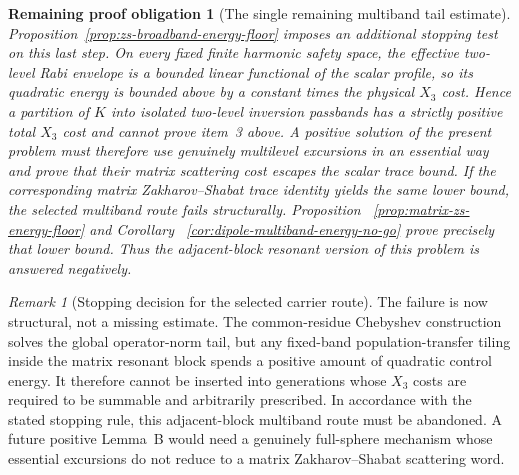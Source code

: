 \documentclass[11pt]{article}
\newtheorem{problem}[theorem]{Remaining proof obligation}
\theoremstyle{remark}
\newtheorem{remark}[theorem]{Remark}
\begin{document}
\begin{problem}[The single remaining multiband tail estimate]
Proposition~\ref{prop:zs-broadband-energy-floor} imposes an additional stopping
test on this last step.  On every fixed finite harmonic safety space, the
effective two-level Rabi envelope is a bounded linear functional of the scalar
profile, so its quadratic energy is bounded above by a constant times the
physical $X_3$ cost.  Hence a partition of $K$ into isolated two-level
inversion passbands has a strictly positive total $X_3$ cost and cannot prove
item~3 above.  A positive solution of the present problem must therefore use
genuinely multilevel excursions in an essential way and prove that their
matrix scattering cost escapes the scalar trace bound.  If the corresponding
matrix Zakharov--Shabat trace identity yields the same lower bound, the
selected multiband route fails structurally.  Proposition
~\ref{prop:matrix-zs-energy-floor} and Corollary
~\ref{cor:dipole-multiband-energy-no-go} prove precisely that lower bound.
Thus the adjacent-block resonant version of this problem is answered
negatively.
\end{problem}

\begin{remark}[Stopping decision for the selected carrier route]
\label{rem:dipole-carrier-route-stops}
The failure is now structural, not a missing estimate.  The common-residue
Chebyshev construction solves the global operator-norm tail, but any
fixed-band population-transfer tiling inside the matrix resonant block spends
a positive amount of quadratic control energy.  It therefore cannot be
inserted into generations whose $X_3$ costs are required to be summable and
arbitrarily prescribed.  In accordance with the stated stopping rule, this
adjacent-block multiband route must be abandoned.  A future positive Lemma~B
would need a genuinely full-sphere mechanism whose essential excursions do
not reduce to a matrix Zakharov--Shabat scattering word.
\end{remark}
\end{document}
